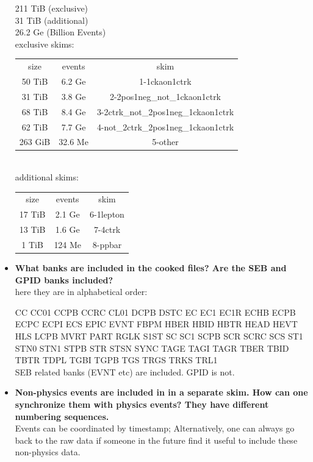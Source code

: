 \documentclass[ 12 pt]{article}
\begin{document}
\begin{itemize}
211 TiB (exclusive)\\
31 TiB (additional)\\
26.2 Ge (Billion Events)\\
exclusive skims:\\
\begin{tabular}{ c c c }
size         &      events  &     skim\\
50 TiB   &    6.2 Ge    &    1-1ckaon1ctrk\\
31 TiB   &    3.8 Ge    &    2-2pos1neg\_not\_1ckaon1ctrk \\
68 TiB   &    8.4 Ge    &    3-2ctrk\_not\_2pos1neg\_1ckaon1ctrk \\
62 TiB   &    7.7 Ge    &    4-not\_2ctrk\_2pos1neg\_1ckaon1ctrk \\
263 GiB &   32.6 Me &      5-other
\end{tabular}
\\
additional skims:\\
\begin{tabular}{ c c c }
size     &  events  &   skim\\
17 TiB &    2.1 Ge  &   6-1lepton\\
13 TiB &    1.6 Ge  &   7-4ctrk\\
1 TiB   & 124 Me &  8-ppbar\\
\end{tabular}

\item \textbf{What banks are included in the cooked files? Are the SEB and GPID banks
included?}\\

here they are in alphabetical order:

CC CC01 CCPB CCRC CL01 DCPB DSTC EC EC1 EC1R ECHB ECPB ECPC ECPI ECS EPIC EVNT FBPM HBER HBID HBTR HEAD HEVT HLS LCPB MVRT PART RGLK S1ST SC SC1 SCPB SCR SCRC SCS ST1 STN0 STN1 STPB STR STSN SYNC TAGE TAGI TAGR TBER TBID TBTR TDPL TGBI TGPB TGS TRGS TRKS TRL1\\
SEB related banks (EVNT etc) are included. GPID is not.


\item \textbf{Non-physics events are included in in a separate skim. How can one
synchronize them with physics events? They have different numbering
sequences.}\\
Events can be coordinated by timestamp; Alternatively, one can always go back to the raw data if someone in the future find it useful to include these non-physics data.



\end{itemize}
\end{document}
